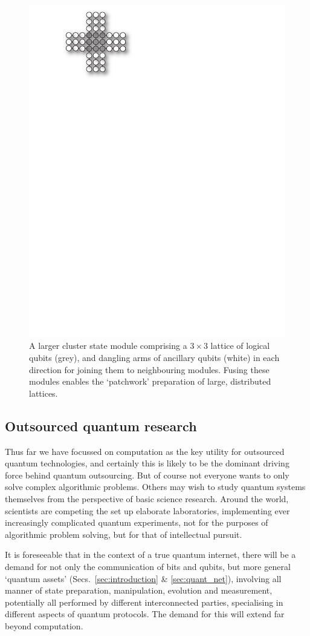 \documentclass[aps, rmp, twocolumn, amsmath, amssymb, nofootinbib, superscriptaddress, longbibliography, floatfix, table-of-contents, eqsecnum]{revtex4-1}
\begin{document}
\begin{figure}[!htb]
\includegraphics[width=0.6\columnwidth]{larger_module}
\caption{A larger cluster state module comprising a \mbox{$3\times 3$} lattice of logical qubits (grey), and dangling arms of ancillary qubits (white) in each direction for joining them to neighbouring modules. Fusing these modules enables the `patchwork' preparation of large, distributed lattices.} \label{fig:larger_module}
\end{figure}

%
%

\subsection{Outsourced quantum research} 

Thus far we have focussed on computation as the key utility for outsourced quantum technologies, and certainly this is likely to be the dominant driving force behind quantum outsourcing. But of course not everyone wants to only solve complex algorithmic problems. Others may wish to study quantum systems themselves from the perspective of basic science research. Around the world, scientists are competing the set up elaborate laboratories, implementing ever increasingly complicated quantum experiments, not for the purposes of algorithmic problem solving, but for that of intellectual pursuit.

It is foreseeable that in the context of a true quantum internet, there will be a demand for not only the communication of bits and qubits, but more general `quantum assets' (Secs.~\ref{sec:introduction} \& \ref{sec:quant_net}), involving all manner of state preparation, manipulation, evolution and measurement, potentially all performed by different interconnected parties, specialising in different aspects of quantum protocols. The demand for this will extend far beyond computation.
\end{document}
